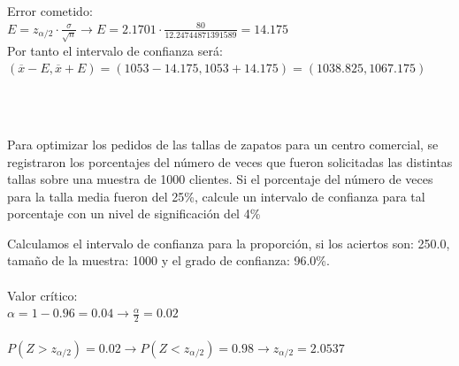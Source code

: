 \documentclass[spanish, 11pt]{exam}
\begin{document}
\begin{questions}
\begin{solution}
    Error cometido: \\ $E=z_{\alpha/2}\cdot \frac{\sigma}{\sqrt{n}} \to E=2.1701\cdot \frac{80}{12.24744871391589}=14.175$ \\ Por tanto el intervalo de confianza será: \\$\left(\overline{x} - E , \overline{x} + E \right)=\left(1053 - 14.175 , 1053 + 14.175 \right)=\left(1038.825, 1067.175 \right)$ \\  \\ 
     \\
       \end{solution}\question Para optimizar los pedidos de las tallas de zapatos para un centro comercial, se
registraron los porcentajes del número de veces que fueron solicitadas las distintas tallas sobre una muestra de
1000 clientes. Si el porcentaje del número de veces para la talla media fueron del 25\%, calcule un intervalo de
confianza para tal porcentaje con un nivel de significación del 4\% \begin{solution}   Calculamos el intervalo de confianza para la proporción, si los aciertos son: 250.0, tamaño de la muestra: 1000 y el grado de confianza: 96.0\%. \\ \\ Valor crítico: \\ $\alpha=1-0.96=0.04\to \frac{\alpha}{2}=0.02$ \\ \\ $P(Z>z_{\alpha/2})=0.02\to P(Z<z_{\alpha/2})=0.98 \to z_{\alpha/2} =2.0537$ \\ 

\end{solution}
\end{questions}
\end{document}
